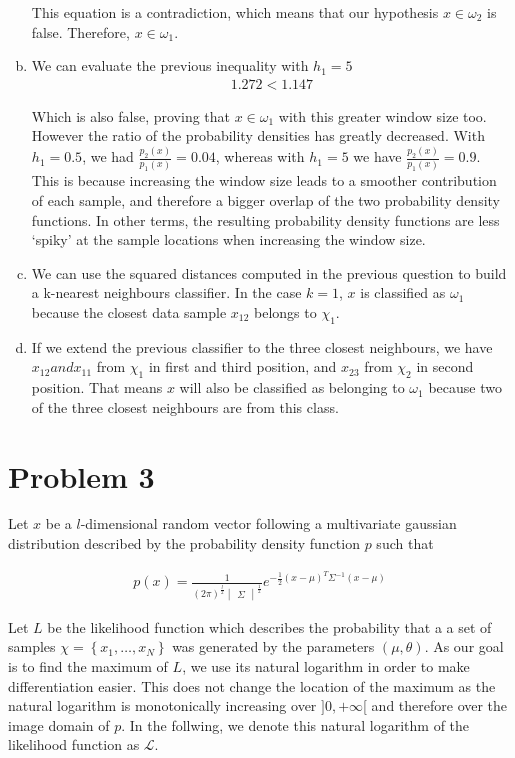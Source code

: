 \documentclass[a4paper, 10pt, twoside]{article}
\begin{document}
\begin{enumerate}[a)]
          This equation is a contradiction, which means that our hypothesis $x \in \omega_2$ is false. Therefore, $x \in \omega_1$.
          \item We can evaluate the previous inequality with $h_1 = 5$
          \begin{align*}
            1.272 < 1.147
          \end{align*}

          Which is also false, proving that $x \in \omega_1$ with this greater window size too. However the ratio of the probability densities has greatly decreased. With $h_1 = 0.5$, we had $\frac{p_2(x)}{p_1(x)} = 0.04$, whereas with $h_1 = 5$ we have $\frac{p_2(x)}{p_1(x)} = 0.9$. This is because increasing the window size leads to a smoother contribution of each sample, and therefore a bigger overlap of the two probability density functions. In other terms, the resulting probability density functions are less `spiky' at the sample locations when increasing the window size.  
          \item We can use the squared distances computed in the previous question to build a k-nearest neighbours classifier. In the case $k = 1$, $x$ is classified as $\omega_1$ because the closest data sample $x_{12}$ belongs to $\chi_1$. 
          \item If we extend the previous classifier to the three closest neighbours, we have $x_{12} and x_{11}$ from $\chi_1$ in first and third position, and $x_{23}$ from $\chi_2$ in second position. That means $x$ will also be classified as belonging to $\omega_1$ because two of the three closest neighbours are from this class.
\end{enumerate}

\section*{Problem 3}
Let $x$ be a $l$-dimensional random vector following a multivariate gaussian distribution described by the probability density function $p$ such that

\begin{align*}
    p(x) =
    \frac{1}{(2\pi)^\frac{l}{2} \begin{vmatrix} \Sigma \end{vmatrix}^\frac{1}{2}}
    e^{-\frac{1}{2} (x-\mu)^T \Sigma^{-1} (x-\mu)}
\end{align*}

Let $L$ be the likelihood function which describes the probability that a a set of samples $\chi = \left\{x_1, \dots, x_N\right\}$ was generated by the parameters $(\mu, \theta)$. As our goal is to find the maximum of $L$, we use its natural logarithm in order to make differentiation easier. This does not change the location of the maximum as the natural logarithm is monotonically increasing over $]0, +\infty$[ and therefore over the image domain of $p$. In the follwing, we denote this natural logarithm of the likelihood function as $\mathcal{L}$.
\end{document}

